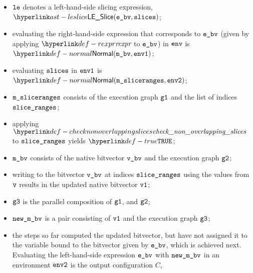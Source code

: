 \ProseParagraph
\AllApply
\begin{itemize}
  \item $\vle$ denotes a left-hand-side slicing expression, $\LESlice(\ebv, \slices)$;
  \item evaluating the right-hand-side expression that corresponds to $\ebv$
  (given by applying $\torexpr$ to $\ebv$) in $\env$
    is $\Normal(\mbv,\envone)$\ProseOrAbnormal;
  \item evaluating $\slices$ in $\envone$ is $\Normal(\msliceranges, \envtwo)$\ProseOrAbnormal;
  \item $\msliceranges$ consists of the execution graph $\vgone$ and the list of indices\\
         $\sliceranges$;
  \item applying $\checknonoverlappingslices$ to $\sliceranges$ yields $\True$\ProseOrError;
  \item $\mbv$ consists of the native bitvector $\vbv$ and the execution graph $\vgtwo$;
  \item writing to the bitvector $\vbv$ at indices $\sliceranges$ using the values from $\vv$
  results in the updated native bitvector $\vvone$\ProseOrError;
  \item $\vgthree$ is the parallel composition of $\vgone$, and $\vgtwo$;
  \item $\newmbv$ is a pair consisting of $\vvone$ and the execution graph $\vgthree$;
  \item the steps so far computed the updated bitvector, but have not assigned it to the
  variable bound to the bitvector given by $\ebv$, which is achieved next.
  Evaluating the left-hand-side expression $\ebv$ with
  $\newmbv$ in an environment $\envtwo$ is the output configuration $C$,
\end{itemize}
\FormallyParagraph
\begin{mathpar}
\end{mathpar}
